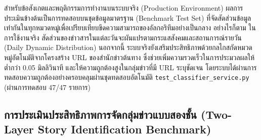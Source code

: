 \begin{table}[H]
\centering
\caption{เมทริกซ์ความสับสน (Confusion Matrix) ของโมเดล 3-Tier Cascade บนชุดข้อมูลทดสอบมาตรฐาน (ThaiSum + Prachathai-67k)}
\label{tab:confusion_matrix}
\end{table}

สำหรับข้อสังเกตและพฤติกรรมการทำงานบนระบบจริง (Production Environment) ผลการประเมินข้างต้นเป็นการทดสอบบนชุดข้อมูลมาตรฐาน (Benchmark Test Set) ที่จัดสัดส่วนข้อมูลเท่ากันในทุกหมวดหมู่เพื่อเปรียบเทียบขีดความสามารถของอัลกอริทึมอย่างเป็นกลาง อย่างไรก็ตาม ในการใช้งานจริง สัดส่วนของข่าวสารในแต่ละวันจะผันแปรตามกระแสสังคมและสถานการณ์รายวัน (Daily Dynamic Distribution) นอกจากนี้ ระบบจริงยังเสริมประสิทธิภาพด้วยกลไกสกัดหมวดหมู่อัตโนมัติจากโครงสร้าง URL ของสำนักข่าวต้นทาง ซึ่งช่วยเพิ่มความรวดเร็วในการประมวลผลให้ต่ำกว่า 0.05 มิลลิวินาที และให้ความถูกต้องสูงในกลุ่มข่าวที่มี URL ระบุชัดเจน โดยระบบได้ผ่านการทดสอบความถูกต้องอย่างครอบคลุมผ่านชุดทดสอบอัตโนมัติ \texttt{test\_classifier\_service.py} (ผ่านการทดสอบ 47/47 รายการ)

\subsection{การประเมินประสิทธิภาพการจัดกลุ่มข่าวแบบสองชั้น (Two-Layer Story Identification Benchmark)}

